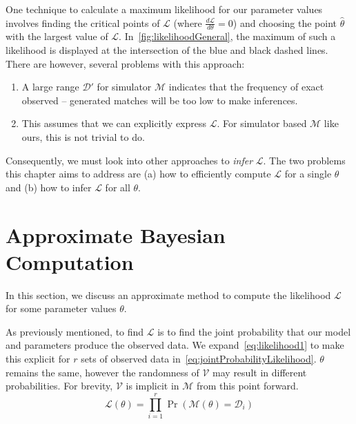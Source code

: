 One technique to calculate a maximum likelihood for our parameter values involves finding the critical points of
$\mathcal{L}$ (where $\frac{d\mathcal{L}}{d\theta} = 0$) and choosing the point $\hat{\theta}$ with the largest value
of $\mathcal{L}$.
In~\autoref{fig:likelihoodGeneral}, the maximum of such a likelihood is displayed at the intersection of the blue and
black dashed lines.
There are however, several problems with this approach:
\begin{enumerate}
    \item A large range $\mathcal{D}'$ for simulator $\mathcal{M}$ indicates that the frequency of exact observed --
        generated matches will be too low to make inferences.
    \item This assumes that we can explicitly express $\mathcal{L}$.
        For simulator based $\mathcal{M}$ like ours, this is not trivial to do.
\end{enumerate}
Consequently, we must look into other approaches to \textit{infer} $\mathcal{L}$.
The two problems this chapter aims to address are (a) how to efficiently compute $\mathcal{L}$ for a single $\theta$
and (b) how to infer $\mathcal{L}$ for all $\theta$.

\section{Approximate Bayesian Computation}\label{sec:approximateBayesianComputation}
In this section, we discuss an approximate method to compute the likelihood $\mathcal{L}$ for some parameter values
$\theta$.

As previously mentioned, to find $\mathcal{L}$ is to find the joint probability that our model and parameters produce
the observed data.
We expand~\autoref{eq:likelihood1} to make this explicit for $r$ sets of observed data
in~\autoref{eq:jointProbabilityLikelihood}.
$\theta$ remains the same, however the randomness of $\mathcal{V}$ may result in different probabilities.
For brevity, $\mathcal{V}$ is implicit in $\mathcal{M}$ from this point forward.
\begin{equation}\label{eq:jointProbabilityLikelihood}
    \mathcal{L}(\theta) = \prod_{i=1}^{r} \Pr\left(\mathcal{M}(\theta) = \mathcal{D}_i \right)
\end{equation}

